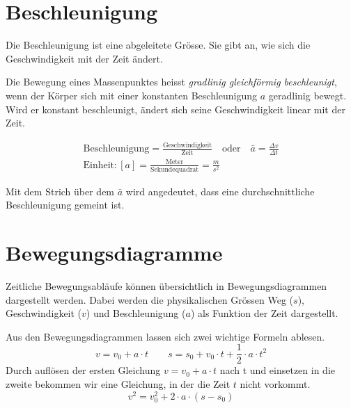 \section*{Beschleunigung}
Die Beschleunigung ist eine abgeleitete Grösse. Sie gibt an, wie sich die Geschwindigkeit
mit der Zeit ändert.

Die Bewegung eines Massenpunktes heisst \emph{gradlinig gleichförmig beschleunigt}, wenn der Körper sich
mit einer konstanten Beschleunigung $a$ geradlinig bewegt.
Wird er konstant beschleunigt, ändert sich seine Geschwindigkeit linear mit der Zeit.

\begin{cbox}
\begin{gather*}
	\text{Beschleunigung} = \frac{\text{Geschwindigkeit}}{\text{Zeit}}\quad\text{oder}\quad \bar{a}=\frac{\Delta v}{\Delta t}\\
		\text{Einheit}: [a] = \frac{\text{Meter}}{\text{Sekundequadrat}}=\frac{\si{m}}{\si{s^2}}
\end{gather*}
\end{cbox}

Mit dem Strich über dem $\bar{a}$ wird angedeutet, dass eine durchschnittliche Beschleunigung 
gemeint ist.





\section*{Bewegungsdiagramme}
Zeitliche Bewegungsabläufe können übersichtlich in Bewegungsdiagrammen dargestellt werden.
Dabei werden die physikalischen Grössen Weg ($s$), Geschwindigkeit ($v$) und Beschleunigung ($a$) als Funktion
der Zeit dargestellt.







Aus den Bewegungsdiagrammen lassen sich zwei wichtige Formeln ablesen.
\begin{equation*}
	v=v_0+a\cdot t \qquad s=s_0 + v_0\cdot t+\frac{1}{2}\cdot a\cdot t^2
\end{equation*}
Durch auflösen der ersten Gleichung $v=v_0+a\cdot t$ nach t und einsetzen in die zweite
bekommen wir eine Gleichung, in der die Zeit $t$ nicht vorkommt.
\begin{equation*}
	v^2=v_0^2+2\cdot a\cdot (s-s_0)
\end{equation*}

